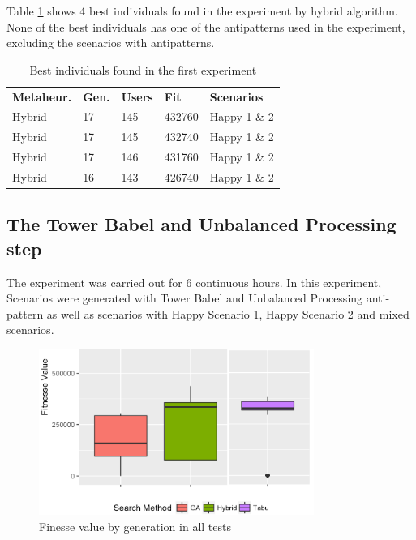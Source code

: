 \documentclass[espaco=umemeio,chapter=TITLE,twoside,openright]{abnt}
\begin{document}
Table \ref{tab:bestindividuals} shows 4 best individuals found in the experiment by hybrid algorithm. None of the best individuals has one of the antipatterns used in the experiment, excluding the scenarios with antipatterns.

\begin{table}[h]
\centering
\caption{Best individuals found in the first experiment}
\label{tab:bestindividuals}
\begin{tabular}{lllll}
\rowcolor[HTML]{C0C0C0}
\textbf{Metaheur.} & \textbf{Gen.} & \textbf{Users} & \textbf{Fit} & \textbf{Scenarios}  \\
Hybrid & 17 & 145 & 432760 & Happy 1 \& 2  \\
Hybrid & 17 & 145 & 432740 & Happy 1 \& 2   \\
Hybrid & 17 & 146 & 431760 & Happy 1 \& 2  \\
Hybrid & 16 & 143 & 426740 & Happy 1 \& 2
\end{tabular}
\end{table}



\subsection{The Tower Babel  and Unbalanced Processing step}


The experiment was carried out for 6 continuous hours. In this experiment, Scenarios were generated with Tower Babel and Unbalanced Processing anti-pattern as well as scenarios with Happy Scenario 1, Happy Scenario 2 and mixed scenarios.

\begin{figure}[h]
\centering
\includegraphics[width=0.8\textwidth]{./images/antipattern2.png}
\caption{Finesse value by generation in all tests}
\label{fig:boxplot2}
\end{figure}
\end{document}
